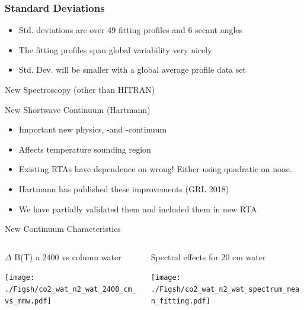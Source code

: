 \documentclass[10pt,t]{beamer}
\begin{document}
  \begin{frame}
    \frametitle{Standard Deviations}
    \begin{itemize}
    \item Std. deviations are over 49 fitting profiles and 6 secant angles
    \item The fitting profiles span global variability very nicely
    \item Std. Dev. will be smaller with a global average profile data set
    \end{itemize}
  \end{frame}

\begin{frame}{New Spectroscopy (other than HITRAN)}
\begin{block}{New Shortwave Continuum (Hartmann)}
\begin{itemize}
\item Important new physics, \nitrogen-\water and \cd-\water continuum
\item Affects temperature sounding region
\item Existing RTAs have dependence on \water wrong!  Either using quadratic on none.
\item Hartmann has published these improvements (GRL 2018)
\item We have partially validated them and included them in new RTA
\end{itemize}
\end{block}
\end{frame}

\begin{frame}[label={sec:org3f23098}]{New Continuum Characteristics}
\begin{columns}
\begin{column}{0.55\columnwidth}
\begin{block}{\small \(\Delta\) B(T) a 2400 \wn vs column water}
\begin{center}
\texttt{[image: ./Figsh/co2\_wat\_n2\_wat\_2400\_cm\_vs\_mmw.pdf]}
\end{center}
\end{block}
\end{column}

\begin{column}{0.55\columnwidth}
\begin{block}{\small Spectral effects for 20 cm water}
\begin{center}
\texttt{[image: ./Figsh/co2\_wat\_n2\_wat\_spectrum\_mean\_fitting.pdf]}
\end{center}
\end{block}
\end{column}
\end{columns}
\end{frame}
\end{document}
